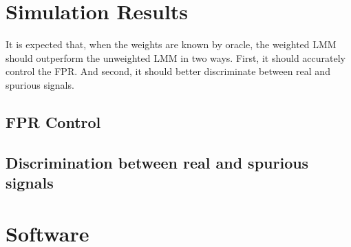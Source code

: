 
\newpage
\section{Simulation Results}

It is expected that, when the weights are known by oracle, the weighted LMM should outperform the unweighted LMM in two ways.
First, it should accurately control the FPR.
And second, it should better discriminate between real and spurious signals.


\subsection{FPR Control}



\subsection{Discrimination between real and spurious signals}


\section{Software}